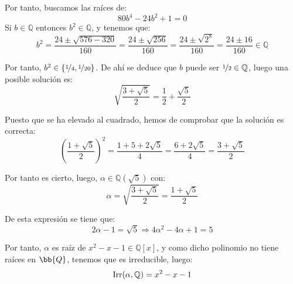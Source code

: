 \begin{ejercicio}
    Por tanto, buscamos las raíces de:
    \begin{equation*}
        80b^4 - 24b^2 +1 = 0 
    \end{equation*}
    Si $b\in \mathbb{Q}$ entonces $b^2\in \mathbb{Q}$, y tenemos que:
    \begin{equation*}
        b^2 = \frac{24 \pm \sqrt{576-320}}{160} = \frac{24\pm \sqrt{256}}{160} = \frac{24\pm\sqrt{2^8}}{160} = \frac{24\pm16}{160} \in \mathbb{Q}
    \end{equation*}
    
    Por tanto, $b^2 \in \{\nicefrac{1}{4}, \nicefrac{1}{20}\}$. De ahí se deduce que $b$ puede ser $\nicefrac{1}{2}\in \mathbb{Q}$, luego una posible solución es:
    \begin{equation*}
        \sqrt{\frac{3+\sqrt{5}}{2}} = \frac{1}{2} + \frac{\sqrt{5}}{2}
    \end{equation*}

    Puesto que se ha elevado al cuadrado, hemos de comprobar que la solución es correcta:
    \begin{equation*}
        {\left(\frac{1+\sqrt{5}}{2}\right)}^{2} = \frac{1+5+2\sqrt{5}}{4} = \frac{6+2\sqrt{5}}{4} = \frac{3+\sqrt{5}}{2}
    \end{equation*}

    Por tanto es cierto, luego, $\alpha\in \mathbb{Q}\left(\sqrt{5}\right)$ con:
    \begin{equation*}
        \alpha = \sqrt{\frac{3+\sqrt{5}}{2}} = \frac{1+\sqrt{5}}{2}
    \end{equation*}
    
    De esta expresión se tiene que:
    \begin{equation*}
        2\alpha -1 = \sqrt{5} \Longrightarrow 4\alpha^2 -4\alpha + 1 = 5
    \end{equation*}
    
    Por tanto, $\alpha$ es raíz de $x^2-x-1\in \mathbb{Q}[x]$, y como dicho polinomio no tiene raíces en $\bb{Q}$, tenemos que es irreducible, luego:
    $$\operatorname{Irr}(\alpha,\mathbb{Q}) = x^2-x-1$$
\end{ejercicio}



